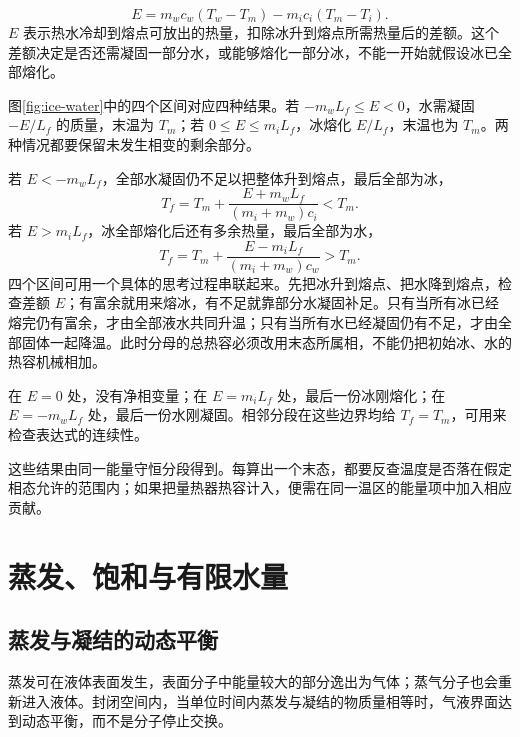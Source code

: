 \[E=m_wc_w(T_w-T_m)-m_ic_i(T_m-T_i).
\]
$E$ 表示热水冷却到熔点可放出的热量，扣除冰升到熔点所需热量后的差额。这个差额决定是否还需凝固一部分水，或能够熔化一部分冰，不能一开始就假设冰已全部熔化。


图\ref{fig:ice-water}中的四个区间对应四种结果。若 $-m_wL_f\le E<0$，水需凝固 $-E/L_f$ 的质量，末温为 $T_m$；若 $0\le E\le m_iL_f$，冰熔化 $E/L_f$，末温也为 $T_m$。两种情况都要保留未发生相变的剩余部分。

若 $E<-m_wL_f$，全部水凝固仍不足以把整体升到熔点，最后全部为冰，
\[T_f=T_m+\frac{E+m_wL_f}{(m_i+m_w)c_i}<T_m.
\]
若 $E>m_iL_f$，冰全部熔化后还有多余热量，最后全部为水，
\[T_f=T_m+\frac{E-m_iL_f}{(m_i+m_w)c_w}>T_m.
\]
四个区间可用一个具体的思考过程串联起来。先把冰升到熔点、把水降到熔点，检查差额 $E$；有富余就用来熔冰，有不足就靠部分水凝固补足。只有当所有冰已经熔完仍有富余，才由全部液水共同升温；只有当所有水已经凝固仍有不足，才由全部固体一起降温。此时分母的总热容必须改用末态所属相，不能仍把初始冰、水的热容机械相加。

在 $E=0$ 处，没有净相变量；在 $E=m_iL_f$ 处，最后一份冰刚熔化；在 $E=-m_wL_f$ 处，最后一份水刚凝固。相邻分段在这些边界均给 $T_f=T_m$，可用来检查表达式的连续性。

这些结果由同一能量守恒分段得到。每算出一个末态，都要反查温度是否落在假定相态允许的范围内；如果把量热器热容计入，便需在同一温区的能量项中加入相应贡献。

\section{蒸发、饱和与有限水量}
\subsection{蒸发与凝结的动态平衡}
蒸发可在液体表面发生，表面分子中能量较大的部分逸出为气体；蒸气分子也会重新进入液体。封闭空间内，当单位时间内蒸发与凝结的物质量相等时，气液界面达到动态平衡，而不是分子停止交换。

